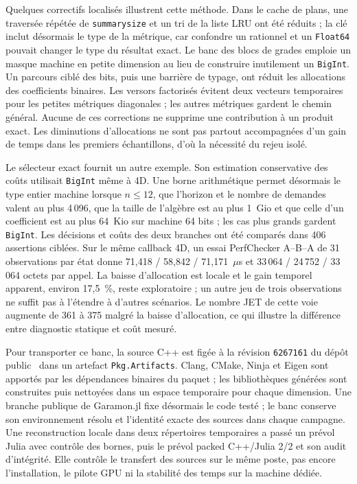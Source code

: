 \documentclass[11pt,a4paper]{article}
\newcommand{\code}[1]{\texttt{#1}}
\begin{document}
Quelques correctifs localisés illustrent cette méthode. Dans le
cache de plans, une traversée répétée de \code{summarysize} et un
tri de la liste LRU ont été réduits ; la clé inclut désormais le
type de la métrique, car confondre un rationnel et un \code{Float64}
pouvait changer le type du résultat exact. Le banc des blocs de
grades emploie un masque machine en petite dimension au lieu de
construire inutilement un \code{BigInt}. Un parcours ciblé des bits,
puis une barrière de typage, ont réduit les allocations des
coefficients binaires. Les versors factorisés évitent deux vecteurs
temporaires pour les petites métriques diagonales ; les autres
métriques gardent le chemin général. Aucune de ces corrections ne
supprime une contribution à un produit exact. Les diminutions
d'allocations ne sont pas partout accompagnées d'un gain de temps
dans les premiers échantillons, d'où la nécessité du rejeu isolé.

Le sélecteur exact fournit un autre exemple. Son estimation
conservative des coûts utilisait \code{BigInt} même à 4D. Une borne
arithmétique permet désormais le type entier machine lorsque
$n\leq12$, que l'horizon et le nombre de demandes valent au plus
4\,096, que la taille de l'algèbre est au plus 1~Gio et que celle
d'un coefficient est au plus 64~Kio sur machine 64 bits ; les cas
plus grands gardent \code{BigInt}. Les décisions et coûts des deux
branches ont été comparés dans 406 assertions ciblées. Sur le
même callback 4D, un essai PerfChecker A--B--A de 31 observations
par état donne 71,418 / 58,842 / 71,171~\(\mu\)s et
33\,064 / 24\,752 / 33\,064 octets par appel. La baisse d'allocation
est locale et le gain temporel apparent, environ 17,5~\%, reste
exploratoire ; un autre jeu de trois observations ne suffit pas
à l'étendre à d'autres scénarios. Le nombre JET de cette voie
augmente de 361 à 375 malgré la baisse d'allocation, ce qui
illustre la différence entre diagnostic statique et coût mesuré.

Pour transporter ce banc, la source C++ est figée à la révision
\code{6267161} du dépôt public~\cite{garamoncpp} dans un artefact
\code{Pkg.Artifacts}. Clang, CMake, Ninja et Eigen sont apportés
par les dépendances binaires du paquet ; les bibliothèques
générées sont construites puis nettoyées dans un espace temporaire
pour chaque dimension. Une branche publique de Garamon.jl fixe désormais
le code testé ; le banc conserve son environnement résolu et l'identité
exacte des sources dans chaque campagne. Une
reconstruction locale dans deux répertoires temporaires a passé
un prévol Julia avec contrôle des bornes, puis le prévol packed
C++/Julia 2/2 et son audit d'intégrité. Elle contrôle le transfert
des sources sur le même poste, pas encore l'installation, le pilote
GPU ni la stabilité des temps sur la machine dédiée.
\end{document}
